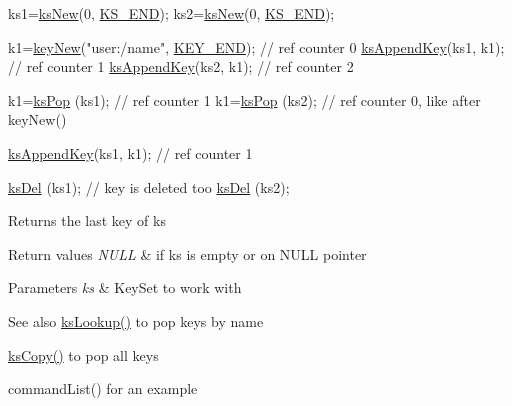 \begin{DoxyCode}
ks1=\hyperlink{group__keyset_ga671e1aaee3ae9dc13b4834a4ddbd2c3c}{ksNew}(0, \hyperlink{group__keyset_ga7a28fce3773b2c873c94ac80b8b4cd54}{KS\_END});
ks2=\hyperlink{group__keyset_ga671e1aaee3ae9dc13b4834a4ddbd2c3c}{ksNew}(0, \hyperlink{group__keyset_ga7a28fce3773b2c873c94ac80b8b4cd54}{KS\_END});

k1=\hyperlink{group__key_gad23c65b44bf48d773759e1f9a4d43b89}{keyNew}(\textcolor{stringliteral}{"user:/name"}, \hyperlink{group__key_gga9b703ca49f48b482def322b77d3e6bc8aa8adb6fcb92dec58fb19410eacfdd403}{KEY\_END}); \textcolor{comment}{// ref counter 0}
\hyperlink{group__keyset_gaa5a1d467a4d71041edce68ea7748ce45}{ksAppendKey}(ks1, k1); \textcolor{comment}{// ref counter 1}
\hyperlink{group__keyset_gaa5a1d467a4d71041edce68ea7748ce45}{ksAppendKey}(ks2, k1); \textcolor{comment}{// ref counter 2}

k1=\hyperlink{group__keyset_gae42530b04defb772059de0600159cf69}{ksPop} (ks1); \textcolor{comment}{// ref counter 1}
k1=\hyperlink{group__keyset_gae42530b04defb772059de0600159cf69}{ksPop} (ks2); \textcolor{comment}{// ref counter 0, like after keyNew()}

\hyperlink{group__keyset_gaa5a1d467a4d71041edce68ea7748ce45}{ksAppendKey}(ks1, k1); \textcolor{comment}{// ref counter 1}

\hyperlink{group__keyset_ga27e5c16473b02a422238c8d970db7ac8}{ksDel} (ks1); \textcolor{comment}{// key is deleted too}
\hyperlink{group__keyset_ga27e5c16473b02a422238c8d970db7ac8}{ksDel} (ks2);
\end{DoxyCode}


\begin{DoxyReturn}{Returns}
the last key of {\ttfamily ks} 
\end{DoxyReturn}

\begin{DoxyRetVals}{Return values}
{\em N\+U\+LL} & if {\ttfamily ks} is empty or on N\+U\+LL pointer \\
\hline
\end{DoxyRetVals}

\begin{DoxyParams}{Parameters}
{\em ks} & Key\+Set to work with \\
\hline
\end{DoxyParams}
\begin{DoxySeeAlso}{See also}
\hyperlink{group__keyset_ga60f1ddcf23272f2b29b90e92ebe9b56f}{ks\+Lookup()} to pop keys by name 

\hyperlink{group__keyset_gaba1f1dbea191f4d7e7eb3e4296ae7d5e}{ks\+Copy()} to pop all keys 

command\+List() for an example 
\end{DoxySeeAlso}
\mbox{\label{group__keyset_gabe793ff51f1728e3429c84a8a9086b70}} 
